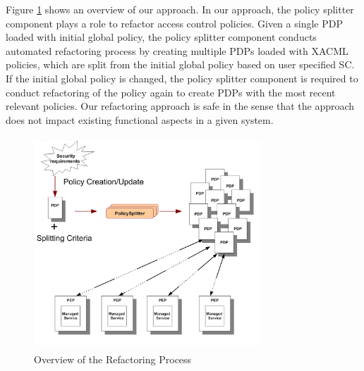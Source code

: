 Figure \ref{overallprocess} shows an overview of our approach.
In our approach, the policy splitter component plays a role to refactor access control policies.
Given a single PDP loaded with initial global policy, the policy splitter component conducts automated refactoring process by creating multiple PDPs loaded with XACML policies, which are split from the initial global policy based on user specified SC.
If the initial global policy is changed, the policy splitter component is required to conduct refactoring of the policy again to create PDPs with the most recent relevant policies.
Our refactoring approach is safe in the sense that the approach does not impact existing functional aspects in a given
system.


\begin{figure}[!h]
\begin{center}
\includegraphics[width=8.5cm, height=8cm]{Overall-process}
\caption{Overview of the Refactoring Process}
\label{overallprocess}
\end{center}
\end{figure}

